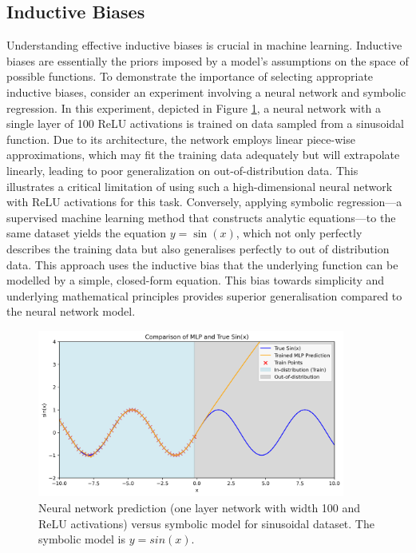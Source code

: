 \documentclass[11pt]{article}
\begin{document}
\subsection{Inductive Biases}
Understanding effective inductive biases is crucial in machine learning. Inductive biases are essentially the priors imposed by a model's assumptions on the space of possible functions. To demonstrate the importance of selecting appropriate inductive biases, consider an experiment involving a neural network and symbolic regression. In this experiment, depicted in Figure \ref{fig:nn_vs_sym_sin}, a neural network with a single layer of 100 ReLU activations is trained on data sampled from a sinusoidal function. Due to its architecture, the network employs linear piece-wise approximations, which may fit the training data adequately but will extrapolate linearly, leading to poor generalization on out-of-distribution data. This illustrates a critical limitation of using such a high-dimensional neural network with ReLU activations for this task. Conversely, applying symbolic regression---a supervised machine learning method that constructs analytic equations---to the same dataset yields the equation \(y = \sin(x)\), which not only perfectly describes the training data but also generalises perfectly to out of distribution data. This approach uses the inductive bias that the underlying function can be modelled by a simple, closed-form equation. This bias towards simplicity and underlying mathematical principles provides superior generalisation compared to the neural network model.


\begin{figure}[H]
    \centering
    \includegraphics[width=0.9\textwidth]{figs/analytic_vs_nn_inductive_bias.png}
    \caption{Neural network prediction (one layer network with width 100 and ReLU activations)  versus symbolic model for sinusoidal dataset. The symbolic model is $y = sin(x)$.}
    \label{fig:nn_vs_sym_sin}
\end{figure}
\end{document}
